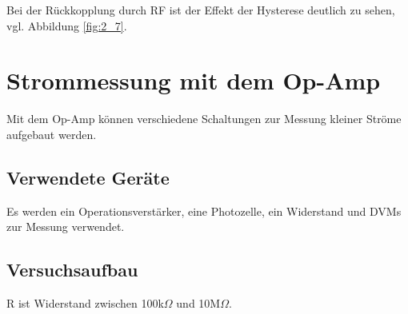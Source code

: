 \documentclass[12pt,a4paper]{article}
\begin{document}
Bei der Rückkopplung durch RF ist der Effekt der Hysterese deutlich zu sehen, vgl. Abbildung \ref{fig:2_7}.

\section{Strommessung mit dem Op-Amp}
Mit dem Op-Amp können verschiedene Schaltungen zur Messung kleiner Ströme aufgebaut werden.
\subsection{Verwendete Geräte}

Es werden ein Operationsverstärker, eine Photozelle, ein Widerstand und DVMs zur Messung verwendet.

\subsection{Versuchsaufbau}

R ist Widerstand zwischen 100k$\Omega$ und 10M$\Omega$.
\end{document}
